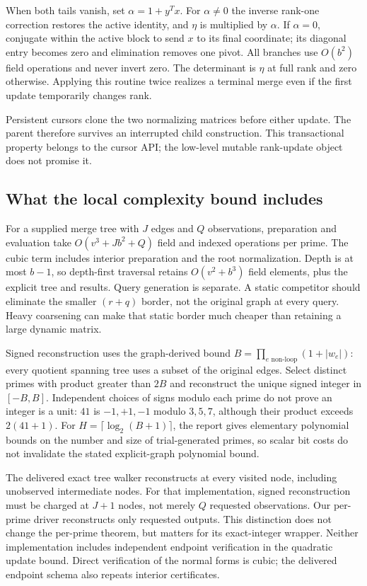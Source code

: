 When both tails vanish, set $\alpha=1+y^Tx$. For $\alpha\ne0$ the inverse
rank-one correction restores the active identity, and $\eta$ is multiplied
by $\alpha$. If $\alpha=0$, conjugate within the active block to send $x$
to its final coordinate; its diagonal entry becomes zero and elimination
removes one pivot. All branches use $O(b^2)$ field operations and never
invert zero. The determinant is $\eta$ at full rank and zero otherwise.
Applying this routine twice realizes a terminal merge even if the first
update temporarily changes rank.

Persistent cursors clone the two normalizing matrices before either update.
The parent therefore survives an interrupted child construction. This
transactional property belongs to the cursor API; the low-level mutable
rank-update object does not promise it.

\subsection{What the local complexity bound includes}

For a supplied merge tree with $J$ edges and $Q$ observations, preparation
and evaluation take $O(v^3+Jb^2+Q)$ field and indexed operations per prime.
The cubic term includes interior preparation and the root normalization.
Depth is at most $b-1$, so depth-first traversal retains $O(v^2+b^3)$ field
elements, plus the explicit tree and results. Query generation is separate.
A static competitor should eliminate the smaller $(r+q)$ border, not the
original graph at every query. Heavy coarsening can make that static border
much cheaper than retaining a large dynamic matrix.

Signed reconstruction uses the graph-derived bound
$B=\prod_{e\text{ non-loop}}(1+|w_e|)$: every quotient spanning tree uses
a subset of the original edges. Select distinct primes with product greater
than $2B$ and reconstruct the unique signed integer in $[-B,B]$. Independent
choices of signs modulo each prime do not prove an integer is a unit:
$41$ is $-1,+1,-1$ modulo $3,5,7$, although their product exceeds $2(41+1)$.
For $H=\lceil\log_2(B+1)\rceil$, the report gives elementary polynomial
bounds on the number and size of trial-generated primes, so scalar bit
costs do not invalidate the stated explicit-graph polynomial bound.

The delivered exact tree walker reconstructs at every visited node, including
unobserved intermediate nodes. For that implementation, signed reconstruction
must be charged at $J+1$ nodes, not merely $Q$ requested observations. Our
per-prime driver reconstructs only requested outputs. This distinction does
not change the per-prime theorem, but matters for its exact-integer wrapper.
Neither implementation includes independent endpoint verification in the
quadratic update bound. Direct verification of the normal forms is cubic;
the delivered endpoint schema also repeats interior certificates.


